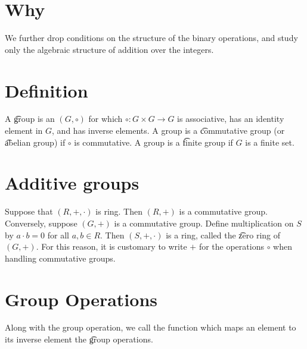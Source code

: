 

\section*{Why}

We further drop conditions on the structure of the binary operations, and study only the algebraic structure of addition over the integers.

\section*{Definition}

A \t{group} is an $(G, \circ)$ for which $\circ: G \times  G \to G$ is associative, has an identity element in $G$, and has inverse elements.
A group is a \t{commutative group} (or \t{abelian group}) if $\circ$ is commutative.
A group is a \t{finite group} if $G$ is a finite set.

\section*{Additive groups}

Suppose that $(R, +, \cdot )$ is ring.
Then $(R, +)$ is a commutative group.
Conversely, suppose $(G, +)$ is a commutative group.
Define multiplication on $S$ by $a\cdot b = 0$ for all $a, b \in R$.
Then $(S, +, \cdot )$ is a ring, called the \t{zero ring} of $(G, +)$.
For this reason, it is customary to write $+$ for the operations $\circ$ when handling commutative groups.

\section*{Group Operations}

Along with the group operation, we call the function which maps an element to its inverse element the \t{group operations}.

\blankpage